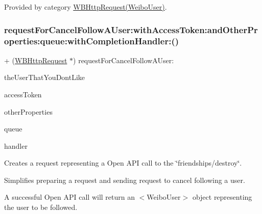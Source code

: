 Provided by category \mbox{\hyperlink{category_w_b_http_request_07_weibo_user_08_a0a601918d65f1776f99882facc1349e3}{W\+B\+Http\+Request(\+Weibo\+User)}}.

\mbox{\label{interface_w_b_http_request_a0a601918d65f1776f99882facc1349e3}} 
\subsubsection{\texorpdfstring{request\+For\+Cancel\+Follow\+A\+User\+:with\+Access\+Token\+:and\+Other\+Properties\+:queue\+:with\+Completion\+Handler\+:()}{requestForCancelFollowAUser:withAccessToken:andOtherProperties:queue:withCompletionHandler:()}\hspace{0.1cm}{\footnotesize\ttfamily [2/3]}}
{\footnotesize\ttfamily + (\mbox{\hyperlink{interface_w_b_http_request}{W\+B\+Http\+Request}} $\ast$) request\+For\+Cancel\+Follow\+A\+User\+: \begin{DoxyParamCaption}\item[{(N\+S\+String $\ast$)}]{the\+User\+That\+You\+Dont\+Like }\item[{withAccessToken:(N\+S\+String $\ast$)}]{access\+Token }\item[{andOtherProperties:(N\+S\+Dictionary $\ast$)}]{other\+Properties }\item[{queue:(N\+S\+Operation\+Queue $\ast$)}]{queue }\item[{withCompletionHandler:(W\+B\+Request\+Handler)}]{handler }\end{DoxyParamCaption}}

Creates a request representing a Open A\+PI call to the \char`\"{}friendships/destroy\char`\"{}.

Simplifies preparing a request and sending request to cancel following a user.

A successful Open A\+PI call will return an $<$\+Weibo\+User$>$ object representing the user to be followed.

